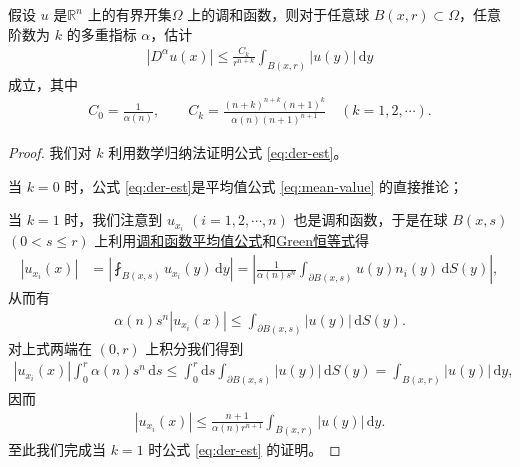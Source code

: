 \documentclass[../../main.tex]{subfiles}%
\begin{document}
\begin{theorem}\label{theorem:调和函数微分的积分估计}
假设 $u$ 是$\mathbb{R}^n$ 上的有界开集$\Omega$ 上的调和函数，则对于任意球 $B(x,r)\subset\Omega$，任意阶数为 $k$ 的多重指标 $\alpha$，估计
\begin{align}
|D^\alpha u(x)| \leqslant \frac{C_k}{r^{n+k}} \int_{B(x,r)} |u(y)|\,\mathrm{d}y \label{eq:der-est}
\end{align}
成立，其中
\begin{align*}
C_0 = \frac{1}{\alpha(n)},\qquad C_k = \frac{(n+k)^{n+k}(n+1)^k}{\alpha(n)(n+1)^{n+1}} \quad (k=1,2,\cdots). 
\end{align*}
\end{theorem}
\begin{proof}
我们对 $k$ 利用数学归纳法证明公式 \eqref{eq:der-est}。

当 $k=0$ 时，公式 \eqref{eq:der-est}是平均值公式 \eqref{eq:mean-value} 的直接推论；

当 $k=1$ 时，我们注意到 $u_{x_i}$ $(i=1,2,\cdots,n)$ 也是调和函数，于是在球 $B(x,s)$ $(0<s\leqslant r)$ 上利用\hyperref[theorem:调和函数平均值公式]{调和函数平均值公式}和\hyperref[theorem:Green恒等式-3]{Green恒等式}得
\begin{align*}
|u_{x_i}(x)| &= \left| \fint_{B(x,s)} u_{x_i}(y)\,\mathrm{d}y \right| = \left| \frac{1}{\alpha(n)s^n} \int_{\partial B(x,s)} u(y)n_i(y)\,\mathrm{d}S(y) \right|,
\end{align*}
从而有
\begin{align*}
\alpha(n)s^n |u_{x_i}(x)| \leqslant \int_{\partial B(x,s)} |u(y)|\,\mathrm{d}S(y).
\end{align*}
对上式两端在 $(0,r)$ 上积分我们得到
\begin{align*}
|u_{x_i}(x)| \int_0^r \alpha(n)s^n\,\mathrm{d}s \leqslant \int_0^r \mathrm{d}s \int_{\partial B(x,s)} |u(y)|\,\mathrm{d}S(y) = \int_{B(x,r)} |u(y)|\,\mathrm{d}y,
\end{align*}
因而
\begin{align}
|u_{x_i}(x)| \leqslant \frac{n+1}{\alpha(n)r^{n+1}} \int_{B(x,r)} |u(y)|\,\mathrm{d}y. \label{eq:der-k1}
\end{align}
至此我们完成当 $k=1$ 时公式 \eqref{eq:der-est} 的证明。


\end{proof}
\end{document}
